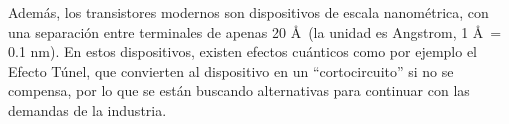 Además, los transistores modernos son dispositivos de escala nanométrica, con una separación entre terminales de apenas 20 \AA\ (la unidad es Angstrom, 1 \AA\ = 0.1 nm). En estos dispositivos, existen efectos cuánticos como por ejemplo el Efecto Túnel, que convierten al dispositivo en un ``cortocircuito'' si no se compensa, por lo que se están buscando alternativas para continuar con las demandas de la industria.
